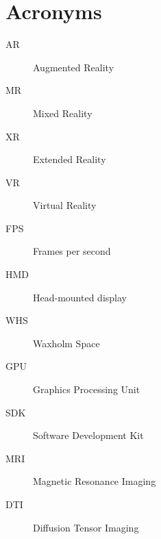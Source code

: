 
\chapter{Acronyms}
\begin{description}
\item[AR] Augmented Reality
\item[MR] Mixed Reality
\item[XR] Extended Reality
\item[VR] Virtual Reality
\item[FPS] Frames per second
\item[HMD] Head-mounted display
\item[WHS] Waxholm Space
\item[GPU] Graphics Processing Unit
\item[SDK] Software Development Kit
\item[MRI] Magnetic Resonance Imaging 
\item[DTI] Diffusion Tensor Imaging 
\end{description}